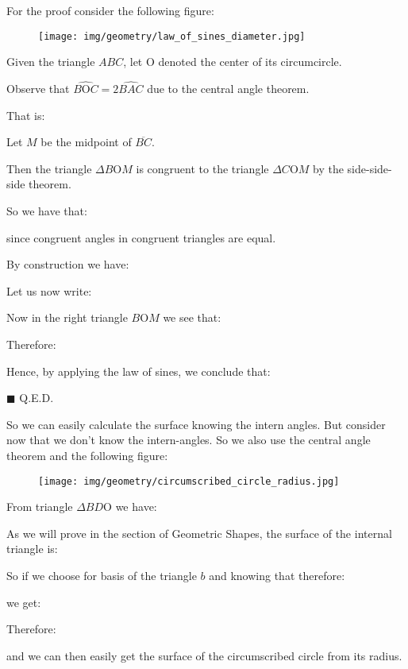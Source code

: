 	\begin{theorem}
	
	\end{theorem}
	\begin{dem}
	For the proof consider the following figure:
	\begin{figure}[H]
		\centering
		\texttt{[image: img/geometry/law\_of\_sines\_diameter.jpg]}
	\end{figure}
	Given the triangle $ABC$, let O denoted the center of its circumcircle. 

	Observe that $\widehat{B\text{O}C}=2\widehat{BAC}$ due to the central angle theorem.

	That is:
	
	Let $M$ be the midpoint of $\overline{BC}$.

	Then the triangle $\Delta B\text{O}M$ is congruent to the triangle $\Delta C\text{O}M$ by the side-side-side theorem.
	
	So we have that:
	
	since congruent angles in congruent triangles are equal.
	
	By construction we have:
	
	Let us now write:
	
	Now in the right triangle $B\text{O}M$ we see that:
	
	Therefore:
	
	Hence, by applying the law of sines, we conclude that:
	
	\begin{flushright}
		$\blacksquare$  Q.E.D.
	\end{flushright}
	\end{dem}
	So we can easily calculate the surface knowing the intern angles. But consider now that we don't know the intern-angles. So we also use the central angle theorem and the following figure:
	\begin{figure}[H]
		\centering
		\texttt{[image: img/geometry/circumscribed\_circle\_radius.jpg]}
	\end{figure}
	From triangle $\Delta BD\text{O}$ we have:
	
	As we will prove in the section of Geometric Shapes, the surface of the internal triangle is:
	
	So if we choose for basis of the triangle $b$ and knowing that therefore:
	
	we get:
	
	Therefore:
	
	and we can then easily get the surface of the circumscribed circle from its radius.
	
